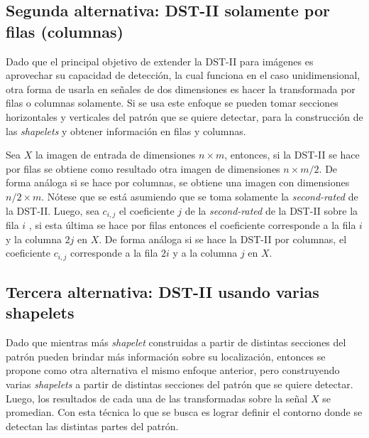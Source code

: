 \subsection{Segunda alternativa: DST-II solamente por filas (columnas)}

Dado que el principal objetivo de extender la DST-II para imágenes es aprovechar su capacidad de detección, la cual funciona 
en el caso unidimensional, otra forma de usarla en señales de dos dimensiones es hacer la transformada
por filas o columnas solamente.
Si se usa este enfoque se pueden tomar secciones horizontales y verticales del patrón que se quiere detectar, para 
la construcción de las \textit{shapelets} y obtener información en filas y columnas.

Sea $X$ la imagen de entrada de dimensiones $n\times m$, entonces, si la DST-II se hace por filas se obtiene
como resultado otra imagen de dimensiones $n \times m/2$. De forma análoga si se hace por columnas, se obtiene
una imagen con dimensiones $n/2 \times m$. Nótese que se está asumiendo que se toma solamente la 
\textit{second-rated} de la DST-II. Luego, sea $c_{i,j}$ el coeficiente $j$ de la \textit{second-rated} 
de la DST-II sobre la fila $i$ , si esta última se hace por filas
entonces el coeficiente corresponde a la fila $i$ y la columna $2j$ en $X$. De forma análoga si se hace
la DST-II por columnas, el coeficiente $c_{i,j}$ corresponde a la fila $2i$ y a la columna $j$ en $X$.

\subsection{Tercera alternativa: DST-II usando varias shapelets}

Dado que mientras más \textit{shapelet} construidas a partir de distintas secciones del patrón pueden brindar más información
sobre su localización, entonces se propone como otra alternativa el mismo enfoque anterior, pero construyendo
varias \textit{shapelets} a partir de distintas secciones del patrón que se quiere detectar. Luego, los resultados
de cada una de las transformadas sobre la señal $X$ se promedian. Con esta técnica lo que se busca es lograr definir
el contorno donde se detectan las distintas partes del patrón.


